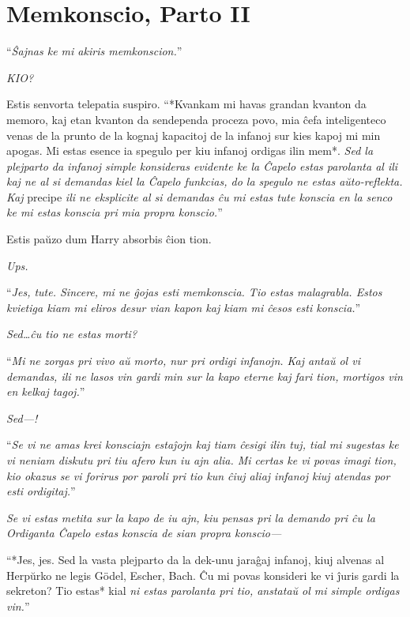 \chapter{Memkonscio, Parto II}


\hplettrineextrapara
``\emph{Ŝajnas ke mi akiris memkonscion.}''

\emph{KIO?}

Estis senvorta telepatia suspiro. ``*Kvankam mi havas grandan kvanton
da memoro, kaj etan kvanton da sendependa proceza povo, mia ĉefa
inteligenteco venas de la prunto de la kognaj kapacitoj de la infanoj
sur kies kapoj mi min apogas. Mi estas esence ia spegulo per kiu
infanoj ordigas ilin mem*. \emph{Sed la plejparto da infanoj simple
  konsideras evidente ke la Ĉapelo estas parolanta al ili kaj ne al si
  demandas kiel la Ĉapelo funkcias, do la spegulo ne estas
  aŭto-reflekta. Kaj} precipe \emph{ili ne eksplicite al si demandas
  ĉu mi estas tute konscia en la senco ke mi estas konscia pri mia
  propra konscio.}''

Estis paŭzo dum Harry absorbis ĉion tion.

\emph{Ups.}

``\emph{Jes, tute. Sincere, mi ne ĝojas esti memkonscia. Tio estas
  malagrabla. Estos kvietiga kiam mi eliros desur vian kapon kaj kiam
  mi ĉesos esti konscia.}''

\emph{Sed\ldots ĉu tio ne estas morti?}

``\emph{Mi ne zorgas pri vivo aŭ morto, nur pri ordigi infanojn. Kaj
  antaŭ ol vi demandas, ili ne lasos vin gardi min sur la kapo eterne
  kaj fari tion, mortigos vin en kelkaj tagoj.}''

\emph{Sed—!}

``\emph{Se vi ne amas krei konsciajn estaĵojn kaj tiam ĉesigi ilin
  tuj, tial mi sugestas ke vi neniam diskutu pri tiu afero kun iu ajn
  alia. Mi certas ke vi povas imagi tion, kio okazus se vi forirus por
  paroli pri tio kun ĉiuj aliaj infanoj kiuj atendas por esti
  ordigitaj.}''

\emph{Se vi estas metita sur la kapo de iu ajn, kiu pensas pri la
  demando pri ĉu la Ordiganta Ĉapelo estas konscia de sian propra
  konscio—}

``*Jes, jes. Sed la vasta plejparto da la dek-unu jaraĝaj infanoj,
kiuj alvenas al Herpŭrko ne legis Gödel, Escher, Bach.  Ĉu mi povas
konsideri ke vi ĵuris gardi la sekreton? Tio estas* kial \emph{ni
  estas parolanta pri tio, anstataŭ ol mi simple ordigas vin.}''

